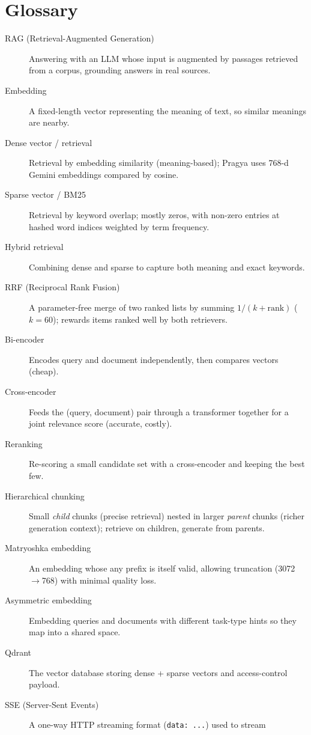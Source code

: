 \documentclass[11pt,a4paper,oneside]{report}
\newcommand{\code}[1]{\texttt{#1}}
\begin{document}
\chapter{Glossary}
\label{app:glossary}
\begin{description}
  \item[RAG (Retrieval-Augmented Generation)] Answering with an LLM whose input is augmented by
  passages retrieved from a corpus, grounding answers in real sources.
  \item[Embedding] A fixed-length vector representing the meaning of text, so similar meanings are
  nearby.
  \item[Dense vector / retrieval] Retrieval by embedding similarity (meaning-based); Pragya uses 768-d
  Gemini embeddings compared by cosine.
  \item[Sparse vector / BM25] Retrieval by keyword overlap; mostly zeros, with non-zero entries at
  hashed word indices weighted by term frequency.
  \item[Hybrid retrieval] Combining dense and sparse to capture both meaning and exact keywords.
  \item[RRF (Reciprocal Rank Fusion)] A parameter-free merge of two ranked lists by summing
  $1/(k+\text{rank})$ ($k=60$); rewards items ranked well by both retrievers.
  \item[Bi-encoder] Encodes query and document independently, then compares vectors (cheap).
  \item[Cross-encoder] Feeds the (query, document) pair through a transformer together for a joint
  relevance score (accurate, costly).
  \item[Reranking] Re-scoring a small candidate set with a cross-encoder and keeping the best few.
  \item[Hierarchical chunking] Small \emph{child} chunks (precise retrieval) nested in larger
  \emph{parent} chunks (richer generation context); retrieve on children, generate from parents.
  \item[Matryoshka embedding] An embedding whose any prefix is itself valid, allowing truncation
  (3072$\to$768) with minimal quality loss.
  \item[Asymmetric embedding] Embedding queries and documents with different task-type hints so they
  map into a shared space.
  \item[Qdrant] The vector database storing dense + sparse vectors and access-control payload.
  \item[SSE (Server-Sent Events)] A one-way HTTP streaming format (\code{data: ...}) used to stream

\end{description}
\end{document}
